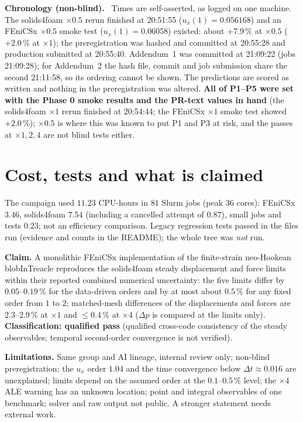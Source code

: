 \documentclass[sn-mathphys,Numbered]{sn-jnl}
\renewcommand{\paragraph}[1]{\par\vspace{0.3\baselineskip}\noindent\textbf{#1}\ }
\newcommand{\FE}{FEniCSx}
\begin{document}
\paragraph{Chronology (non-blind).}
Times are self-asserted, as logged on one machine. The solids4foam $\times0.5$ rerun finished at 20:51:55 ($u_x(1)=0.056168$) and an \FE{} $\times0.5$ smoke test ($u_x(1)=0.06058$) existed: about $+7.9\,\%$ at $\times0.5$ ($+2.0\,\%$ at $\times1$); the preregistration was hashed and committed at 20:55:28 and production submitted at 20:55:40. Addendum~1 was committed at 21:09:22 (jobs 21:09:28); for Addendum~2 the hash file, commit and job submission share the second 21:11:58, so its ordering cannot be shown. The predictions are scored as written and nothing in the preregistration was altered. \textbf{All of P1--P5 were set with the Phase 0 smoke results and the PR-text values in hand} (the solids4foam $\times1$ rerun finished at 20:54:44; the \FE{} $\times1$ smoke test showed $+2.0\,\%$); $\times0.5$ is where this was known to put P1 and P3 at risk, and the passes at $\times1,2,4$ are not blind tests either.

\section{Cost, tests and what is claimed}\label{sec:nh_claim}
The campaign used $11.23$ CPU-hours in $81$ Slurm jobs (peak $36$ cores): \FE{} $3.46$, solids4foam $7.54$ (including a cancelled attempt of $0.87$), small jobs and tests $0.23$; not an efficiency comparison. Legacy regression tests passed in the files run (evidence and counts in the README); the whole tree was \emph{not} run.

\textbf{Claim.} A monolithic \FE{} implementation of the finite-strain neo-Hookean blobInTreacle reproduces the solids4foam steady displacement and force limits within their reported combined numerical uncertainty: the five limits differ by $0.05$--$0.19\,\%$ for the data-driven orders and by at most about $0.5\,\%$ for any fixed order from $1$ to $2$; matched-mesh differences of the displacements and forces are $2.3$--$2.9\,\%$ at $\times1$ and $\le0.4\,\%$ at $\times4$ ($\Delta p$ is compared at the limits only). \textbf{Classification: qualified pass} (qualified cross-code consistency of the steady observables; temporal second-order convergence is not verified).

\textbf{Limitations.} Same group and AI lineage, internal review only; non-blind preregistration; the $u_x$ order $1.04$ and the time convergence below $\Delta t\approx0.016$ are unexplained; limits depend on the assumed order at the $0.1$--$0.5\,\%$ level; the $\times4$ ALE warning has an unknown location; point and integral observables of one benchmark; solver and raw output not public. A stronger statement needs external work.
\end{document}
